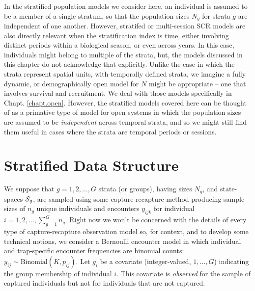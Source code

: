 In the stratified population models we consider here, an individual is
assumed to be a member of a single stratum, so that the population
sizes $N_{g}$ for strata $g$ are independent of one another. However,
stratifed or multi-session SCR models are also directly relevant when
the stratification index is time, either involving distinct periods within
a biological season, or even across years. In this case, individuals
might belong to multiple of the strata, but, the models discussed in
this chapter do not acknowledge that explicitly.
Unlike the case in which the strata represent spatial units, with
temporally defined strata, we imagine a fully dynamic, or
demographically open model for $N$ might be appropriate -- one that
involves survival and recruitment. We deal with those models
specifically in Chapt. \ref{chapt.open}.  However, the stratified
models covered here can be thought of as a primative type of model for
open systems in which the population sizes are assumed to be {\it
  independent} across temporal strata, and so we might still find them
useful in cases where the strata are temporal periods or sessions.

\section{Stratified Data Structure}


We suppose that $g=1,2,\ldots,G$ strata (or groups), having sizes $N_{g}$,
and state-spaces ${\cal S}_{g}$, are sampled using some capture-recapture
method producing sample sizes of $n_{g}$ unique individuals and
encounters $y_{ijk}$ for individual $i=1,2,\ldots, \sum_{g=1}^{G}
n_{g}$.  Right now we won't be concerned with the details of every
type of capture-recapture observation model so, for context, and to
develop some technical notions, we
consider a Bernoulli encounter model in which individual and trap-specific
encounter frequencies are binomial counts: $y_{ij} \sim
\mbox{Binomial}(K,p_{ij})$.  Let $g_{i}$ be a covariate
(integer-valued, $1, \ldots, G$) indicating the group membership
of individual $i$. This covariate is {\it observed} for the sample of
captured individuals but not for individuals that are not captured.

